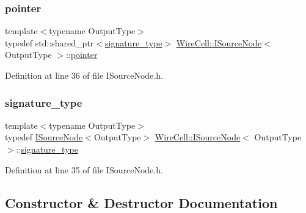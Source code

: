 \mbox{\label{class_wire_cell_1_1_i_source_node_a960422a6c4fca9db6057f73704c2c6c3}} 
\subsubsection{\texorpdfstring{pointer}{pointer}}
{\footnotesize\ttfamily template$<$typename Output\+Type$>$ \\
typedef std\+::shared\+\_\+ptr$<$\hyperlink{class_wire_cell_1_1_i_source_node_ae80709587615faffda92fc12d7052bdc}{signature\+\_\+type}$>$ \hyperlink{class_wire_cell_1_1_i_source_node}{Wire\+Cell\+::\+I\+Source\+Node}$<$ Output\+Type $>$\+::\hyperlink{class_wire_cell_1_1_interface_a09c548fb8266cfa39afb2e74a4615c37}{pointer}}



Definition at line 36 of file I\+Source\+Node.\+h.

\mbox{\label{class_wire_cell_1_1_i_source_node_ae80709587615faffda92fc12d7052bdc}} 
\subsubsection{\texorpdfstring{signature\+\_\+type}{signature\_type}}
{\footnotesize\ttfamily template$<$typename Output\+Type$>$ \\
typedef \hyperlink{class_wire_cell_1_1_i_source_node}{I\+Source\+Node}$<$Output\+Type$>$ \hyperlink{class_wire_cell_1_1_i_source_node}{Wire\+Cell\+::\+I\+Source\+Node}$<$ Output\+Type $>$\+::\hyperlink{class_wire_cell_1_1_i_source_node_ae80709587615faffda92fc12d7052bdc}{signature\+\_\+type}}



Definition at line 35 of file I\+Source\+Node.\+h.



\subsection{Constructor \& Destructor Documentation}
\mbox{\label{class_wire_cell_1_1_i_source_node_ad7061b2d026afe5e8ba14c85e5607b19}} 
